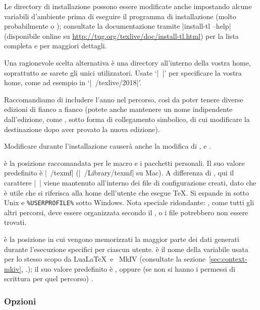\documentclass{article}
\begin{document}
Le directory di installazione possono essere modificate anche impostando
alcune variabili d'ambiente prima di eseguire il programma di
installazione (molto probabilmente  o
); consultate la documentazione tramite
|install-tl --help| (disponibile online su
\url{http://tug.org/texlive/doc/install-tl.html}) per la lista completa e
per maggiori dettagli.

Una ragionevole scelta alternativa è una directory all'interno della
vostra home, soprattutto se sarete gli unici utilizzatori. Usate `|~|'
per specificare la vostra home, come ad esempio in `|~/texlive/2018|'.

Raccomandiamo di includere l'anno nel percorso, così da poter tenere
diverse edizioni di \TL{} fianco a fianco (potete anche mantenere un nome
indipendente dall'edizione, come , sotto
forma di collegamento simbolico, di cui modificare la destinazione dopo
aver provato la nuova edizione).

Modificare  durante l'installazione causerà anche la
modifica di ,  e
.

 è la posizione raccomandata per le macro e i pacchetti
personali. Il suo valore predefinito è |~/texmf| (|~/Library/texmf| su Mac).
A differenza di , qui il carattere |~| viene mantenuto all'interno dei
file di configurazione creati, dato che è utile che si riferisca alla home
dell'utente che esegue \TeX. Si espande in  sotto
Unix e \verb|%USERPROFILE%| sotto Windows. Nota speciale ridondante:
, come tutti gli altri percorsi, deve essere organizzata
secondo il \TDS, o i file potrebbero non essere trovati. %

 è la posizione in cui vengono memorizzati la maggior
parte dei dati generati durante l'esecuzione specifici per ciascun utente.
 è il nome della variabile usata per lo stesso scopo da
Lua\LaTeX\ e \ConTeXt\ MkIV (consultate la
sezione~\ref{sec:context-mkiv}, \p.\pageref{sec:context-mkiv}); il suo
valore predefinito è , oppure (se non si hanno i
permessi di scrittura per quel percorso) .


\subsubsection{Opzioni}
\label{sec:options}
\end{document}
